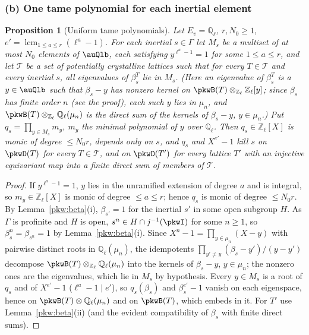 \documentclass[10pt]{amsart}
\newtheorem{proposition}[theorem]{Proposition}
\theoremstyle{definition}
\theoremstyle{remark}
\newcommand{\Z}{\mathbb Z}
\newcommand{\Q}{\mathbb Q}
\begin{document}
\subsubsection*{(b) One tame polynomial for each inertial element}

\begin{proposition}[Uniform tame polynomials]\label{pkw:G4}
Let $E_v=\Q_\ell$, $r,N_0\ge1$, $e'=\operatorname{lcm}_{1\le a\le r}(\ell^a-1)$. For each inertial $s\in\Gamma$ let
$M_s$ be a multiset of at most $N_0$ elements of $\auQlb$, each satisfying $y^{\ell^a-1}=1$ for some $1\le a\le r$,
and let $\mathcal T$ be a set of potentially crystalline lattices such that for every $T\in\mathcal T$ and every
inertial $s$, all eigenvalues of $\beta_s^T$ lie in $M_s$. (Here an eigenvalue of $\beta_s^T$ is a
$y\in\auQlb$ such that $\beta_s-y$ has nonzero kernel on $\pkwB(T)\otimes_{\Z_\ell}\Z_\ell[y]$; since $\beta_s$ has
finite order $n$ (see the proof), each such $y$ lies in $\mu_n$, and $\pkwB(T)\otimes_{\Z_\ell}\Q_\ell(\mu_n)$ is
the direct sum of the kernels of $\beta_s-y$, $y\in\mu_n$.) Put $q_s=\prod_{y\in M_s}m_y$, $m_y$ the minimal
polynomial of $y$ over $\Q_\ell$. Then $q_s\in\Z_\ell[X]$ is monic of degree $\le N_0r$, depends only on $s$, and
$q_s$ and $X^{e'}-1$ kill $s$ on $\pkwD(T)$ for every $T\in\mathcal T$, and on $\pkwD(T')$ for every lattice $T'$
with an injective equivariant map into a finite direct sum of members of $\mathcal T$.
\end{proposition}

\begin{proof}
If $y^{\ell^a-1}=1$, $y$ lies in the unramified extension of degree $a$ and is integral, so $m_y\in\Z_\ell[X]$ is
monic of degree $\le a\le r$; hence $q_s$ is monic of degree $\le N_0r$. By Lemma~\ref{pkw:beta}(i), $\beta_{s'}=1$ for the
inertial $s'$ in some open subgroup $H$. As $\Gamma$ is profinite and $H$ is open, $s^n\in H\cap j^{-1}(\pkwI)$
for some $n\ge1$, so $\beta_s^n=\beta_{s^n}=1$ by Lemma~\ref{pkw:beta}(i). Since $X^n-1=\prod_{y\in\mu_n}(X-y)$
with pairwise distinct roots in $\Q_\ell(\mu_n)$, the idempotents $\prod_{y'\ne y}(\beta_s-y')/(y-y')$ decompose
$\pkwB(T)\otimes_{\Z_\ell}\Q_\ell(\mu_n)$ into the kernels of $\beta_s-y$, $y\in\mu_n$; the nonzero ones are the
eigenvalues, which lie in $M_s$ by hypothesis. Every $y\in M_s$ is a root of $q_s$ and of $X^{e'}-1$
($\ell^a-1\mid e'$), so $q_s(\beta_s)$ and $\beta_s^{e'}-1$ vanish on each eigenspace, hence on
$\pkwB(T)\otimes\Q_\ell(\mu_n)$ and on $\pkwB(T)$, which embeds in it. For $T'$ use
Lemma~\ref{pkw:beta}(ii) (and the evident compatibility of $\beta_s$ with finite direct sums).
\end{proof}
\end{document}
